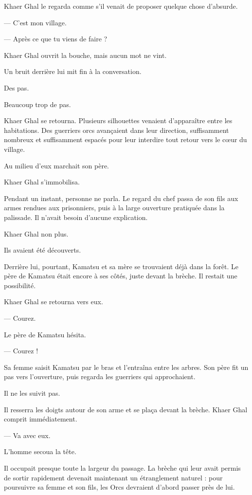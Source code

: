 Khaer Ghal le regarda comme s'il venait de proposer quelque chose d'absurde.

— C'est mon village.

— Après ce que tu viens de faire ?

Khaer Ghal ouvrit la bouche, mais aucun mot ne vint.

Un bruit derrière lui mit fin à la conversation.

Des pas.

Beaucoup trop de pas.

Khaer Ghal se retourna. Plusieurs silhouettes venaient d'apparaître entre les
habitations. Des guerriers orcs avançaient dans leur direction, suffisamment
nombreux et suffisamment espacés pour leur interdire tout retour vers le cœur
du village.

Au milieu d'eux marchait son père.

Khaer Ghal s'immobilisa.


Pendant un instant, personne ne parla. Le regard du chef passa de son fils aux
armes rendues aux prisonniers, puis à la large ouverture pratiquée dans la
palissade. Il n'avait besoin d'aucune explication.

Khaer Ghal non plus.

Ils avaient été découverts.

Derrière lui, pourtant, Kamatsu et sa mère se trouvaient déjà dans la forêt.
Le père de Kamatsu était encore à ses côtés, juste devant la brèche. Il restait
une possibilité.

Khaer Ghal se retourna vers eux.

— Courez.

Le père de Kamatsu hésita.

— Courez !

Sa femme saisit Kamatsu par le bras et l'entraîna entre les arbres. Son père
fit un pas vers l'ouverture, puis regarda les guerriers qui approchaient.

Il ne les suivit pas.

Il resserra les doigts autour de son arme et se plaça devant la brèche. Khaer
Ghal comprit immédiatement.

— Va avec eux.

L'homme secoua la tête.

Il occupait presque toute la largeur du passage. La brèche qui leur avait
permis de sortir rapidement devenait maintenant un étranglement naturel : pour
poursuivre sa femme et son fils, les Orcs devraient d'abord passer près de lui.

